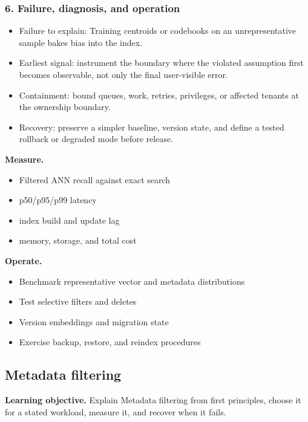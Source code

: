 \subsubsection*{6. Failure, diagnosis, and operation}
\begin{itemize}
\item Failure to explain: Training centroids or codebooks on an unrepresentative sample bakes bias into the index.
\item Earliest signal: instrument the boundary where the violated assumption first becomes observable, not only the final user-visible error.
\item Containment: bound queues, work, retries, privileges, or affected tenants at the ownership boundary.
\item Recovery: preserve a simpler baseline, version state, and define a tested rollback or degraded mode before release.
\end{itemize}
\textbf{Measure.}\begin{itemize}
\item Filtered ANN recall against exact search
\item p50/p95/p99 latency
\item index build and update lag
\item memory, storage, and total cost
\end{itemize}
\textbf{Operate.}\begin{itemize}
\item Benchmark representative vector and metadata distributions
\item Test selective filters and deletes
\item Version embeddings and migration state
\item Exercise backup, restore, and reindex procedures
\end{itemize}
\subsection{Metadata filtering}
\textbf{Learning objective.} Explain Metadata filtering from first principles, choose it for a stated workload, measure it, and recover when it fails.
